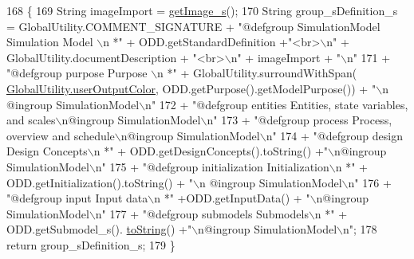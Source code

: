 \begin{DoxyCode}
168                                                \{
169         String imageImport = \hyperlink{classit_1_1isislab_1_1masonassisteddocumentation_1_1mason_1_1analizer_1_1_sim_state_analizer_abff770f4e110a106f049361915f1f390}{getImage\_s}();
170         String group\_sDefinition\_s = GlobalUtility.COMMENT\_SIGNATURE + \textcolor{stringliteral}{"@defgroup SimulationModel
       Simulation Model \(\backslash\)n *"} + ODD.getStandardDefinition +\textcolor{stringliteral}{"<br>\(\backslash\)n"} + GlobalUtility.documentDescription + \textcolor{stringliteral}{"<br>\(\backslash\)n"} + 
      imageImport + \textcolor{stringliteral}{"\(\backslash\)n"}
171                 + \textcolor{stringliteral}{"@defgroup purpose Purpose \(\backslash\)n *"} + GlobalUtility.surroundWithSpan(
      \hyperlink{classit_1_1isislab_1_1masonassisteddocumentation_1_1mason_1_1analizer_1_1_global_utility_a0fcb324ae33eb93bd5b9177e342ecc82}{GlobalUtility.userOutputColor}, ODD.getPurpose().getModelPurpose()) + \textcolor{stringliteral}{"\(\backslash\)n
      @ingroup SimulationModel\(\backslash\)n"}
172                 + \textcolor{stringliteral}{"@defgroup entities Entities, state variables, and scales\(\backslash\)n@ingroup SimulationModel\(\backslash\)n"}
173                 + \textcolor{stringliteral}{"@defgroup process Process, overview and schedule\(\backslash\)n@ingroup SimulationModel\(\backslash\)n"}
174                 + \textcolor{stringliteral}{"@defgroup design Design Concepts\(\backslash\)n *"} + ODD.getDesignConcepts().toString() +\textcolor{stringliteral}{"\(\backslash\)n@ingroup
       SimulationModel\(\backslash\)n"}
175                 + \textcolor{stringliteral}{"@defgroup initialization Initialization\(\backslash\)n *"} + ODD.getInitialization().toString() + \textcolor{stringliteral}{"\(\backslash\)n
      @ingroup SimulationModel\(\backslash\)n"}
176                 + \textcolor{stringliteral}{"@defgroup input Input data\(\backslash\)n *"} +ODD.getInputData() + \textcolor{stringliteral}{"\(\backslash\)n@ingroup SimulationModel\(\backslash\)n"}
177                 + \textcolor{stringliteral}{"@defgroup submodels Submodels\(\backslash\)n *"} + ODD.getSubmodel\_s().
      \hyperlink{classit_1_1isislab_1_1masonassisteddocumentation_1_1mason_1_1analizer_1_1_sim_state_analizer_a14f8302dff6fb0e3a6230c7e53468f41}{toString}() +\textcolor{stringliteral}{"\(\backslash\)n@ingroup SimulationModel\(\backslash\)n"};
178         \textcolor{keywordflow}{return} group\_sDefinition\_s;
179     \}
\end{DoxyCode}


